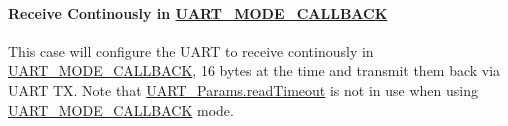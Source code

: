\paragraph*{Receive Continously in \hyperlink{_u_a_r_t_8h_a2507a620dba95cd20885c52494d19e90ae0dbd9b5195e56c3c2aed10163523754}{U\+A\+R\+T\+\_\+\+M\+O\+D\+E\+\_\+\+C\+A\+L\+L\+B\+A\+C\+K}\label{_u_a_r_t_c_c26_x_x_8h_USE_CASE_CB}%
\hypertarget{_u_a_r_t_c_c26_x_x_8h_USE_CASE_CB}{}%
}

This case will configure the U\+A\+R\+T to receive continously in \hyperlink{_u_a_r_t_8h_a2507a620dba95cd20885c52494d19e90ae0dbd9b5195e56c3c2aed10163523754}{U\+A\+R\+T\+\_\+\+M\+O\+D\+E\+\_\+\+C\+A\+L\+L\+B\+A\+C\+K}, 16 bytes at the time and transmit them back via U\+A\+R\+T T\+X. Note that \hyperlink{struct_u_a_r_t___params_a10875d91873fb77106bde0b799f961e2}{U\+A\+R\+T\+\_\+\+Params.\+read\+Timeout} is not in use when using \hyperlink{_u_a_r_t_8h_a2507a620dba95cd20885c52494d19e90ae0dbd9b5195e56c3c2aed10163523754}{U\+A\+R\+T\+\_\+\+M\+O\+D\+E\+\_\+\+C\+A\+L\+L\+B\+A\+C\+K} mode. 
